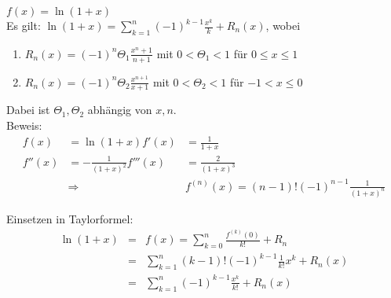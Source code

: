 \documentclass[ngerman,titlepage,twoside, parskip=half*]{scrreprt}
\theoremstyle{plain}
\theoremstyle{definition}
\theoremstyle{remark}
\begin{document}
$f(x)=\ln(1+x)$\\
Es gilt: $\ln(1+x)=\sum_{k=1}^n (-1)^{k-1}\frac{x^k}{k}+R_n(x)$, wobei
\begin{enumerate}
  \item $R_n(x)=(-1)^n \Theta_1\frac{x^n+1}{n+1}$ mit $0<\Theta_1<1$ für 
    $0\leq x\leq 1$
  \item $R_n(x)=(-1)^n\Theta_2\frac{x^{n+1}}{x+1}$ mit $0<\Theta_2<1$ für
    $-1<x\leq 0$
\end{enumerate}
Dabei ist  $\Theta_1,\Theta_2$ abhängig von $x,n$.\\
Beweis:
\begin{align*}
  f(x)&=\ln(1+x)  f'(x)&=\frac{1}{1+x}\\
  f''(x)&=-\frac{1}{(1+x)^2}  f'''(x)&=\frac{2}{(1+x)^3}\\
  &\Longrightarrow &f^{(n)}(x)=(n-1)!(-1)^{n-1}\frac{1}{(1+x)^n}
\end{align*}

Einsetzen in Taylorformel:
\begin{align*}
  \ln(1+x)&=& f(x)=\sum_{k=0}^n \frac{f^{(k)}(0)}{k!}+R_n\\
  &=& \sum_{k=1}^n (k-1)!(-1)^{k-1}\frac{1}{k!}x^k+R_n(x)\\
  &=& \sum_{k=1}^n (-1)^{k-1}\frac{x^k}{k!}+R_n(x)
\end{align*}
\end{document}
